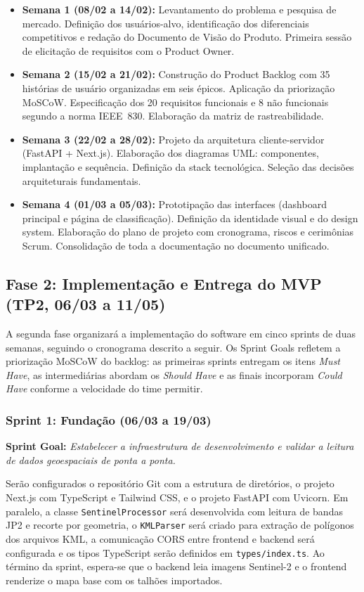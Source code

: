 \documentclass[12pt, a4paper]{article}
\begin{document}
\begin{itemize}
  \item \textbf{Semana 1 (08/02 a 14/02):} Levantamento do problema e pesquisa de mercado. Definição dos usuários-alvo, identificação dos diferenciais competitivos e redação do Documento de Visão do Produto. Primeira sessão de elicitação de requisitos com o Product Owner.
  \item \textbf{Semana 2 (15/02 a 21/02):} Construção do Product Backlog com 35 histórias de usuário organizadas em seis épicos. Aplicação da priorização MoSCoW. Especificação dos 20 requisitos funcionais e 8 não funcionais segundo a norma IEEE~830. Elaboração da matriz de rastreabilidade.
  \item \textbf{Semana 3 (22/02 a 28/02):} Projeto da arquitetura cliente-servidor (FastAPI + Next.js). Elaboração dos diagramas UML: componentes, implantação e sequência. Definição da stack tecnológica. Seleção das decisões arquiteturais fundamentais.
  \item \textbf{Semana 4 (01/03 a 05/03):} Prototipação das interfaces (dashboard principal e página de classificação). Definição da identidade visual e do design system. Elaboração do plano de projeto com cronograma, riscos e cerimônias Scrum. Consolidação de toda a documentação no documento unificado.
\end{itemize}

\subsection{Fase 2: Implementação e Entrega do MVP (TP2, 06/03 a 11/05)}

A segunda fase organizará a implementação do software em cinco sprints de duas semanas, seguindo o cronograma descrito a seguir. Os Sprint Goals refletem a priorização MoSCoW do backlog: as primeiras sprints entregam os itens \textit{Must Have}, as intermediárias abordam os \textit{Should Have} e as finais incorporam \textit{Could Have} conforme a velocidade do time permitir.

\subsubsection{Sprint 1: Fundação (06/03 a 19/03)}

\textbf{Sprint Goal:} \textit{Estabelecer a infraestrutura de desenvolvimento e validar a leitura de dados geoespaciais de ponta a ponta.}

Serão configurados o repositório Git com a estrutura de diretórios, o projeto Next.js com TypeScript e Tailwind CSS, e o projeto FastAPI com Uvicorn. Em paralelo, a classe \texttt{SentinelProcessor} será desenvolvida com leitura de bandas JP2 e recorte por geometria, o \texttt{KMLParser} será criado para extração de polígonos dos arquivos KML, a comunicação CORS entre frontend e backend será configurada e os tipos TypeScript serão definidos em \texttt{types/index.ts}. Ao término da sprint, espera-se que o backend leia imagens Sentinel-2 e o frontend renderize o mapa base com os talhões importados.
\end{document}

